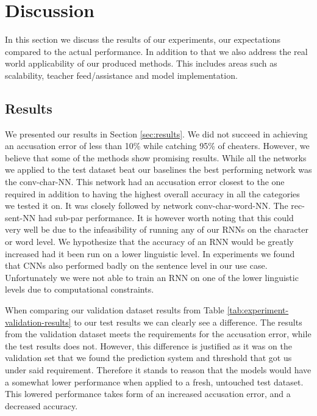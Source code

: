 \section{Discussion} \label{sec:discussion}


In this section we discuss the results of our experiments, our expectations
compared to the actual performance. In addition to that we also address the
real world applicability of our produced methods. This includes areas such as
scalability, teacher feed/assistance and model implementation.


\subsection{Results}

We presented our results in Section \ref{sec:results}. We did not succeed in
achieving an accusation error of less than 10\% while catching 95\% of cheaters.
However, we believe that some of the methods show promising results. While
all the networks we applied to the test dataset beat our baselines the best
performing network was the \gls{conv-char-NN}. This network had an accusation
error closest to the one required in addition to having the highest overall
accuracy in all the categories we tested it on. It was closely followed by
network \gls{conv-char-word-NN}. The \gls{rec-sent-NN} had sub-par performance.
It is however worth noting that this could very well be due to the infeasibility
of running any of our \glspl{RNN} on the character or word level. We hypothesize
that the accuracy of an RNN would be greatly increased had it been run on a
lower linguistic level. In experiments we found that \glspl{CNN} also performed
badly on the sentence level in our use case. Unfortunately we were not able to
train an \gls{RNN} on one of the lower linguistic levels due to computational
constraints.

When comparing our validation dataset results from Table
\ref{tab:experiment-validation-results} to our test results we can clearly see a
difference. The results from the validation dataset meets the requirements for
the accusation error, while the test results does not. However, this difference
is justified as it was on the validation set that we found the prediction system
and threshold that got us under said requirement. Therefore it stands to reason
that the models would have a somewhat lower performance when applied to a fresh,
untouched test dataset. This lowered performance takes form of an increased
accusation error, and a decreased accuracy. 

